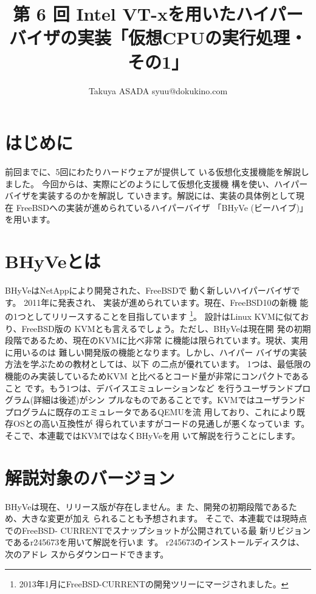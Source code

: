 
\title{第 6 回 Intel VT-xを用いたハイパーバイザの実装「仮想CPUの実行処理・その1」}
\author{Takuya ASADA syuu@dokukino.com}



\maketitle

\section{はじめに}

 前回までに、5回にわたりハードウェアが提供して
いる仮想化支援機能を解説しました。
 今回からは、実際にどのようにして仮想化支援機
構を使い、ハイパーバイザを実装するのかを解説し
ていきます。解説には、実装の具体例として現在
FreeBSDへの実装が進められているハイパーバイザ
「BHyVe (ビーハイブ)」を用います。


\section{BHyVeとは}

 BHyVeはNetAppにより開発された、FreeBSDで
動く新しいハイパーバイザです。 2011年に発表され、
実装が進められています。現在、FreeBSD10の新機
能の1つとしてリリースすることを目指しています
\footnote{2013年1月にFreeBSD-CURRENTの開発ツリーにマージされました。}。
設計はLinux KVMに似ており、FreeBSD版の
KVMとも言えるでしょう。ただし、BHyVeは現在開
発の初期段階であるため、現在のKVMに比べ非常
に機能は限られています。現状、実用に用いるのは
難しい開発版の機能となります。しかし、ハイパー
バイザの実装方法を学ぶための教材としては、以下
の二点が優れています。
 1つは、最低限の機能のみ実装しているためKVM
と比べるとコード量が非常にコンパクトであること
です。もう1つは、デバイスエミュレーションなど
を行うユーザランドプログラム(詳細は後述)がシン
プルなものであることです。KVMではユーザランド
プログラムに既存のエミュレータであるQEMUを流
用しており、これにより既存OSとの高い互換性が
得られていますがコードの見通しが悪くなっていま
す。そこで、本連載ではKVMではなくBHyVeを用
いて解説を行うことにします。

\section{解説対象のバージョン}

 BHyVeは現在、リリース版が存在しません。ま
た、開発の初期段階であるため、大きな変更が加え
られることも予想されます。
  そこで、本連載では現時点でのFreeBSD-
CURRENTでスナップショットが公開されている最
新リビジョンであるr245673を用いて解説を行いま
す。 r245673のインストールディスクは、次のアドレ
スからダウンロードできます。

